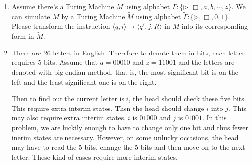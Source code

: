\documentclass[12pt,a4paper]{article}
\makeatletter
\newtheorem*{solution}{Solution}
\theoremstyle{definition}
\renewenvironment{solution}[1][Solution] {\par\pushQED{\qed}\normalfont\topsep6\p@\@plus6\p@\relax\trivlist\item[\hskip\labelsep\bfseries#1\@addpunct{.}]\ignorespaces}{\popQED\endtrivlist\@endpefalse} \makeatother
\makeatother
\begin{document}
\begin{enumerate}
\begin{enumerate}
    	    $$\vdash(q_4,\triangleright\triangleright\triangleright\triangleright\triangleright\triangleright\triangleright\underline{\triangleright}\Box001\triangleleft)
    	    \vdash(q_7,\triangleright\triangleright\triangleright\triangleright\triangleright\triangleright\triangleright\triangleright\underline{\Box}001\triangleleft)
    	    \vdash(q_8,\triangleright\triangleright\triangleright\triangleright\triangleright\triangleright\triangleright\triangleright\triangleright\underline{0}01\triangleleft)
    	    \vdash^*(q_8,\triangleright\triangleright\triangleright\triangleright\triangleright\triangleright\triangleright\triangleright00\underline{1}\triangleleft)
    	    $$
    	    
    	    $$\vdash(q_9,\triangleright\triangleright\triangleright\triangleright\triangleright\triangleright\triangleright\triangleright\triangleright0\underline{0}1\triangleleft)
    	    \vdash(q_9,\triangleright\triangleright\triangleright\triangleright\triangleright\triangleright\triangleright\triangleright\triangleright\underline{0}\triangleleft0\triangleleft)
    	    \vdash(q_5,\triangleright\triangleright\triangleright\triangleright\triangleright\triangleright\triangleright\triangleright\underline{\triangleright}1\triangleleft0\triangleleft)
    	    \vdash(q_H,\triangleright\triangleright\triangleright\triangleright\triangleright\triangleright\triangleright\triangleright\triangleright\underline{1}\triangleleft0\triangleleft)
    	    $$
    	    
    \end{enumerate}
		    

	
	


\item Assume there's a Turing Machine $M$ using alphabet $\Gamma :\{ \triangleright, \Box, a, b, \cdots, z\}$. We can simulate $M$ by a Turing Machine $\tilde{M}$ using alphabet $\tilde{\Gamma }:\{ \triangleright, \Box, 0, 1\}$. Please transform the instruction $\langle q, i \rangle \rightarrow \langle q',j, R\rangle$ in $M$ into its corresponding form in $\tilde{M}$.

\begin{solution}
	There are 26 letters in English. Therefore to denote them in bits, each letter requires 5 bits. Assume that $a=00000$ and $z=11001$ and the letters are denoted with big endian method, that is, the most significant bit is on the left and the least significant one is on the right.
	
	Then to find out the current letter is $i$, the head should check these five bits. This require extra interim states. Then the head should change $i$ into $j$. This may also require extra interim states. $i$ is $01000$ and $j$ is $01001$. In this problem, we are luckily enough to have to change only one bit and thus fewer inerim states are necessary. However, on some unlucky occasions, the head may have to read the 5 bits, change the 5 bits and then move on to the next letter. These kind of cases require more interim states.
	

\end{solution}
\end{enumerate}
\end{document}
